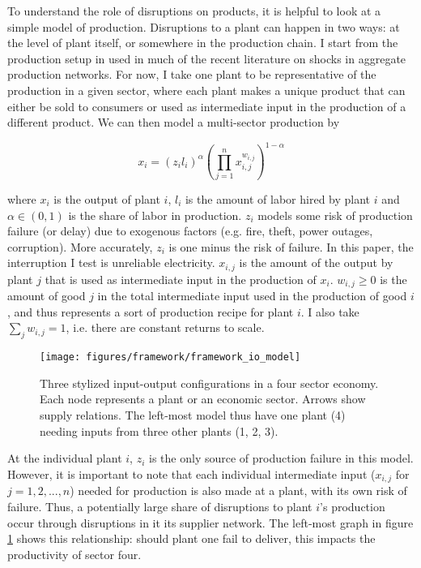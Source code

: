 \documentclass[11pt]{article}
\begin{document}
To understand the role of disruptions on products, it is helpful to look at a simple model of production. Disruptions to a plant can happen in two ways: at the level of plant itself, or somewhere in the production chain. I start from the production setup in \cite{acemoglu_network_2012} used in much of the recent literature on shocks in aggregate production networks. For now, I take one plant to be representative of the production in a given sector, where each plant makes a unique product that can either be sold to consumers or used as intermediate input in the production of a different product. We can then model a multi-sector production by

\[
x_i =  (z_i l_i)^{\alpha}(\prod^{n}_{j = 1} x_{i,j}^{w_{i,j}})^{1 - \alpha}
\]

where $x_i$ is the output of plant $i$, \(l_i\) is the amount of labor hired by plant \(i\) and \(\alpha \in (0, 1)\) is the share of labor in production. \(z_i\) models some risk of production failure (or delay) due to exogenous factors (e.g. fire, theft, power outages, corruption). More accurately, \(z_i\) is one minus the risk of failure. In this paper, the interruption I test is unreliable electricity. \(x_{i,j}\) is the amount of the output by plant \(j\) that is used as intermediate input in the production of \(x_i\). \(w_{i,j} \geq 0\) is the amount of good \(j\) in the total intermediate input used in the production of good \(i\), and thus represents a sort of production recipe for plant \(i\). I also take \(\sum_j w_{i,j} = 1\), i.e. there are constant returns to scale.

\begin{figure}[htpb]
	\centering
	\texttt{[image: figures/framework/framework\_io\_model]}
	\caption[Three input-output configurations]{Three stylized input-output configurations in a four sector economy. Each node represents a plant or an economic sector. Arrows show supply relations. The left-most model thus have one plant (4) needing inputs from three other plants (1, 2, 3).}%
	\label{fig:framework-io-model}
\end{figure}

At the individual plant \(i\), \(z_i\) is the only source of production failure in this model. However, it is important to note that each individual intermediate input (\(x_{i,j}\) for \(j = 1, 2, ..., n\)) needed for production is also made at a plant, with its own risk of failure. Thus, a potentially large share of disruptions to plant $i$'s production occur through disruptions in it its supplier network. The left-most graph in figure \ref{fig:framework-io-model} shows this relationship: should plant one fail to deliver, this impacts the productivity of sector four.
\end{document}
